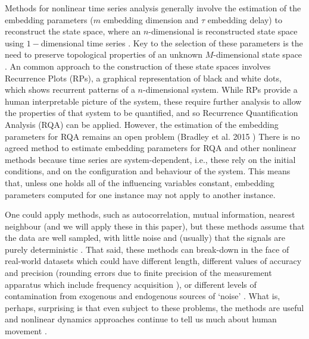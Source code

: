 \documentclass[fleqn,10pt]{wlscirep}
\begin{document}
Methods for nonlinear time series analysis generally involve the estimation of the 
embedding parameters ($m$ embedding dimension and $\tau$ embedding delay) to 
reconstruct the state space,
where an $n$-dimensional is reconstructed state space using $1-$dimensional 
time series \cite{Quintana-Duque2012, Quintana-Duque2016, sama2013, 
frank2010, gomezgarcia2014, marwan2011, stergiou2011}.
Key to the selection of these parameters is the need to preserve 
topological properties of an unknown $M$-dimensional state space \cite{takens1981}.
An common approach to the construction of these state spaces 
involves Recurrence Plots (RPs), a graphical representation of black and white dots, 
which shows recurrent patterns of a $n$-dimensional system.
While RPs provide a human
interpretable picture of the system, these require further
analysis to allow the properties of that system to be quantified,
and so Recurrence Quantification Analysis (RQA) can be applied.
However, the estimation of the embedding parameters for
RQA remains an open problem (Bradley et al. 2015 \cite{bradley2015})
There is no agreed method to estimate embedding parameters
for RQA and other nonlinear methods \cite{bradley2015} 
because time series are system-dependent, i.e., these rely
on the initial conditions, and on the configuration and behaviour of the system.  
This means that, unless one holds all of the influencing 
variables constant, embedding parameters computed for one 
instance may not apply to another instance.   

One could apply methods, such as autocorrelation, mutual information, 
nearest neighbour (and we will apply these in this paper), 
but these methods assume that the data are well sampled, with 
little noise and (usually) that the signals are purely deterministic \cite{garland2016, kantz2003}.
That said, these methods can break-down in the face of real-world datasets 
which could have 
different length, 
different values of accuracy and precision (rounding errors due to finite 
precision of the measurement apparatus which include frequency 
acquisition \cite{frank2010}), or 
different levels of contamination from exogenous and endogenous 
sources of ‘noise’ \cite{garland2016}.  What is, perhaps, surprising is that 
even subject to these problems, the methods are useful and 
nonlinear dynamics approaches continue to tell us much about 
human movement \cite{Quintana-Duque2012, Quintana-Duque2016, sama2013, frank2010,
gomezgarcia2014, marwan2011, stergiou2011, bradley2015}.
\end{document}

